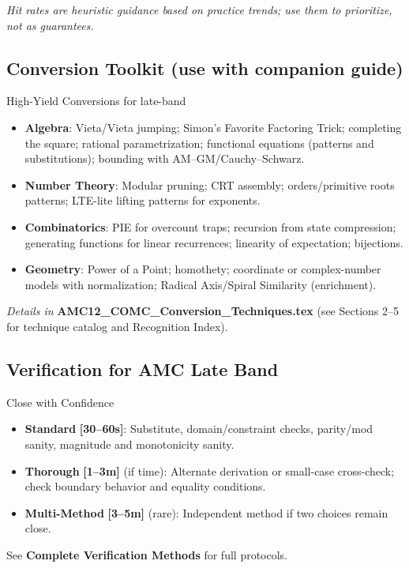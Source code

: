 \documentclass{article}
\newcommand{\timetarget}[1]{\textcolor{timingblue}{\textbf{[#1]}}}
\begin{document}
\noindent\small\textit{Hit rates are heuristic guidance based on practice trends; use them to prioritize, not as guarantees.}

\subsection{Conversion Toolkit (use with companion guide)}
\begin{specializedbox}{High-Yield Conversions for late-band}
\begin{itemize}
    \item \textbf{Algebra}: Vieta/Vieta jumping; Simon's Favorite Factoring Trick; completing the square; rational parametrization; functional equations (patterns and substitutions); bounding with AM--GM/Cauchy--Schwarz.
    \item \textbf{Number Theory}: Modular pruning; CRT assembly; orders/primitive roots patterns; LTE-lite lifting patterns for exponents.
    \item \textbf{Combinatorics}: PIE for overcount traps; recursion from state compression; generating functions for linear recurrences; linearity of expectation; bijections.
    \item \textbf{Geometry}: Power of a Point; homothety; coordinate or complex-number models with normalization; Radical Axis/Spiral Similarity (enrichment).
\end{itemize}
\emph{Details in} \textbf{AMC12\_COMC\_Conversion\_Techniques.tex} (see Sections 2--5 for technique catalog and Recognition Index).
\end{specializedbox}

\subsection{Verification for AMC Late Band}
\begin{standardbox}{Close with Confidence}
\begin{itemize}
    \item \textbf{Standard} \timetarget{30--60s}: Substitute, domain/constraint checks, parity/mod sanity, magnitude and monotonicity sanity.
    \item \textbf{Thorough} \timetarget{1--3m} (if time): Alternate derivation or small-case cross-check; check boundary behavior and equality conditions.
    \item \textbf{Multi-Method} \timetarget{3--5m} (rare): Independent method if two choices remain close.
\end{itemize}
See \textbf{Complete Verification Methods} for full protocols.
\end{standardbox}
\end{document}
